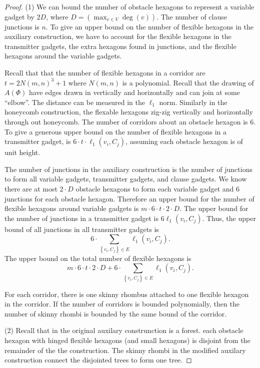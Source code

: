 \documentclass[10pt]{CSUNthesis}
\theoremstyle{plain}%
\theoremstyle{definition}
\theoremstyle{remark}
\newcommand{\lr}[1]{\left( #1 \right)}
\begin{document}
\begin{proof}
\noindent (1) We can bound the number of obstacle hexagons to represent a variable gadget by $2 D$, where $D = \lr{ \max_{v \in V} \deg (v)}$.  
The number of clause junctions is $n$.
To give an upper bound on the number of flexible hexagons in the auxiliary construction, we have to account for the flexible hexagons in the transmitter gadgets, the extra hexagons found in junctions, and the flexible hexagons around the variable gadgets.

Recall that that the number of flexible hexagons in a corridor are $ t = 2N(m,n)^3 + 1 $ where $N(m,n)$ is a polynomial. 
Recall that the drawing of $A(\Phi)$ have edges drawn in vertically and horizontally and can join at some ``elbow''.  
The distance can be measured in the $\ell_1$ norm.
Similarly in the honeycomb construction, the flexable hexagons zig-zig vertically and horizontally through out honeycomb.  
The number of corridors about an obstacle hexagon is $6$.
To give a generous upper bound on the number of flexible hexagons in a transmitter gadget, is $6 \cdot t \cdot \ell_1\lr{v_i,C_j}$, assuming each obstacle hexagon is of unit height.

The number of junctions in the auxiliary construction is the number of junctions to form all variable gadgets, transmitter gadgets, and clause gadgets. 
We know there are at most $2 \cdot D$ obstacle hexagons to form each variable gadget and $6$ junctions for each obstacle hexagon.  
Therefore an upper bound for the number of flexible hexagons around variable gadgets is $m \cdot 6 \cdot t \cdot 2 \cdot D$.
The upper bound for the number of junctions in a transmitter gadget is $6 \ell_1 \lr{v_i, C_j}$.  
Thus, the upper bound of all junctions in all transmitter gadgets is $$6 \cdot \sum_{\left\lbrace v_i, C_j \right\rbrace \in E} \ell_1 \lr{v_i, C_j}.$$
The upper bound on the total number of flexible hexagons is
$$m \cdot 6 \cdot t \cdot 2 \cdot D + 6 \cdot \sum_{\left\lbrace v_i, C_j \right\rbrace \in E} \ell_1 \lr{v_i, C_j}.$$

For each corridor, there is one skinny rhombus attached to one flexible hexagon in the corridor.  If the number of corridors is bounded polynomially, then the number of skinny rhombi is bounded by the same bound of the corridor.

\noindent (2) Recall that in the original auxilary construnction is a forest.
each obstacle hexagon with hinged flexible hexagons (and small hexagons) is disjoint from the remainder of the the construction. 
The skinny rhombi in the modified auxilary construction connect the disjointed trees to form one tree.


\end{proof}
\end{document}
